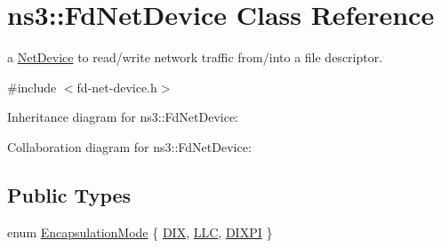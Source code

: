 \hypertarget{classns3_1_1FdNetDevice}{}\section{ns3\+:\+:Fd\+Net\+Device Class Reference}
\label{classns3_1_1FdNetDevice}


a \hyperlink{classns3_1_1NetDevice}{Net\+Device} to read/write network traffic from/into a file descriptor.  




{\ttfamily \#include $<$fd-\/net-\/device.\+h$>$}



Inheritance diagram for ns3\+:\+:Fd\+Net\+Device\+:


Collaboration diagram for ns3\+:\+:Fd\+Net\+Device\+:
\subsection*{Public Types}
\begin{DoxyCompactItemize}
\item 
enum \hyperlink{classns3_1_1FdNetDevice_abdacbf10c181f50998a98e7688016618}{Encapsulation\+Mode} \{ \hyperlink{classns3_1_1FdNetDevice_abdacbf10c181f50998a98e7688016618a47e79129b21891ac4452ab35e05bd17d}{D\+IX}, 
\hyperlink{classns3_1_1FdNetDevice_abdacbf10c181f50998a98e7688016618ac6f7f5fa39999c05c1b1c2c5e5dd8889}{L\+LC}, 
\hyperlink{classns3_1_1FdNetDevice_abdacbf10c181f50998a98e7688016618abbad9c0d0fe0604652f21e33cf4d8798}{D\+I\+X\+PI}
 \}
\end{DoxyCompactItemize}
